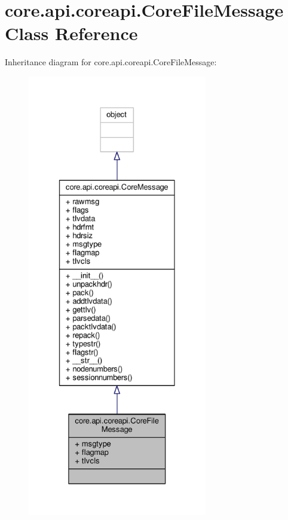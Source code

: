 \hypertarget{classcore_1_1api_1_1coreapi_1_1_core_file_message}{\section{core.\+api.\+coreapi.\+Core\+File\+Message Class Reference}
\label{classcore_1_1api_1_1coreapi_1_1_core_file_message}
}


Inheritance diagram for core.\+api.\+coreapi.\+Core\+File\+Message\+:
\nopagebreak
\begin{figure}[H]
\begin{center}
\leavevmode
\includegraphics[height=550pt]{classcore_1_1api_1_1coreapi_1_1_core_file_message__inherit__graph}
\end{center}
\end{figure}


